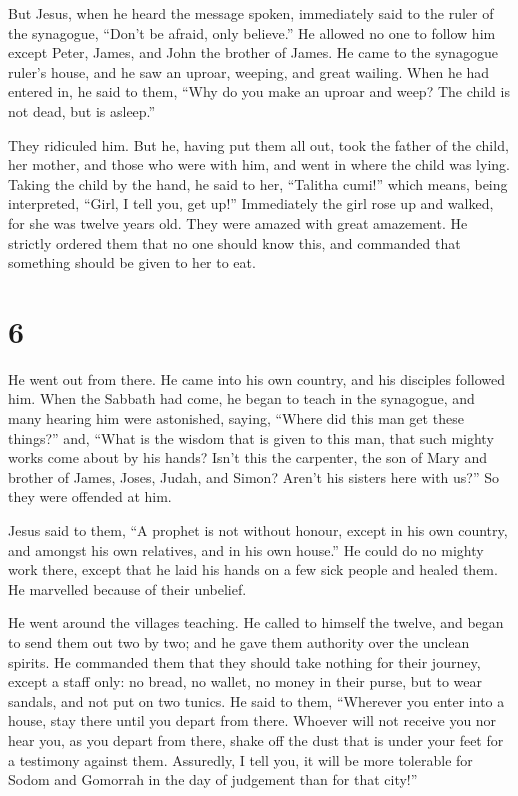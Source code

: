 But Jesus, when he heard the message spoken, immediately
said to the ruler of the synagogue, ``Don't be afraid, only believe.''
 He allowed no one to follow him except Peter, James, and
John the brother of James.  He came to the synagogue
ruler's house, and he saw an uproar, weeping, and great wailing.
 When he had entered in, he said to them, ``Why do you
make an uproar and weep? The child is not dead, but is asleep.''

 They ridiculed him. But he, having put them all out,
took the father of the child, her mother, and those who were with him,
and went in where the child was lying.  Taking the child
by the hand, he said to her, ``Talitha cumi!'' which means, being
interpreted, ``Girl, I tell you, get up!''  Immediately
the girl rose up and walked, for she was twelve years old. They were
amazed with great amazement.  He strictly ordered them
that no one should know this, and commanded that something should be
given to her to eat.

\hypertarget{section-5}{%
\section{6}\label{section-5}}

 He went out from there. He came into his own country, and
his disciples followed him.  When the Sabbath had come, he
began to teach in the synagogue, and many hearing him were astonished,
saying, ``Where did this man get these things?'' and, ``What is the
wisdom that is given to this man, that such mighty works come about by
his hands?  Isn't this the carpenter, the son of Mary and
brother of James, Joses, Judah, and Simon? Aren't his sisters here with
us?'' So they were offended at him.

 Jesus said to them, ``A prophet is not without honour,
except in his own country, and amongst his own relatives, and in his own
house.''  He could do no mighty work there, except that he
laid his hands on a few sick people and healed them.  He
marvelled because of their unbelief.

He went around the villages teaching.  He called to
himself the twelve, and began to send them out two by two; and he gave
them authority over the unclean spirits.  He commanded
them that they should take nothing for their journey, except a staff
only: no bread, no wallet, no money in their purse,  but
to wear sandals, and not put on two tunics.  He said to
them, ``Wherever you enter into a house, stay there until you depart
from there.  Whoever will not receive you nor hear you,
as you depart from there, shake off the dust that is under your feet for
a testimony against them. Assuredly, I tell you, it will be more
tolerable for Sodom and Gomorrah in the day of judgement than for that
city!''

